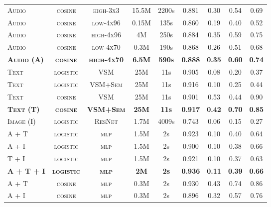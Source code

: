\documentclass{article}
\begin{document}
\begin{table*}[ht]
\begin{threeparttable}
\begin{tabular}{lcccccccc}
\textsc{Audio} & \textsc{cosine} & \textsc{high-3x3}           & 15.5M          & 2200s         & 0.881          & 0.30          & 0.54          & 0.69          \\
\textsc{Audio} & \textsc{cosine} & \textsc{low-4x96}           & 0.15M          & 135s          & 0.860          & 0.19          & 0.40          & 0.52          \\
\textsc{Audio} & \textsc{cosine} & \textsc{high-4x96}          & 4M             & 250s          & 0.884          & 0.35          & 0.59          & 0.75          \\
\textsc{Audio} & \textsc{cosine} & \textsc{low-4x70}           & 0.3M           & 190s          & 0.868          & 0.26          & 0.51          & 0.68          \\
\textbf{\textsc{Audio (A)}} & \textbf{\textsc{cosine}} & \textbf{\textsc{high-4x70}} & \textbf{6.5M}  & \textbf{590s} & \textbf{0.888} & \textbf{0.35} & \textbf{0.60} & \textbf{0.74} \\
\midrule
\textsc{Text} & \textsc{logistic} & \textsc{VSM} & 25M & 11s & 0.905 & 0.08 & 0.20 & 0.37 \\
\textsc{Text} & \textsc{logistic} & \textsc{VSM+Sem} & 25M & 11s & 0.916 & 0.10 & 0.25 & 0.44 \\
\textsc{Text} & \textsc{cosine} & \textsc{VSM} & 25M & 11s & 0.901 & 0.53 & 0.44 & 0.90 \\
\textbf{\textsc{Text (T)}} & \textbf{\textsc{cosine}} & \textbf{\textsc{VSM+Sem}} & \textbf{25M} & \textbf{11s} & \textbf{0.917} & \textbf{0.42} & \textbf{0.70} & \textbf{0.85} \\
\midrule
\textsc{Image (I)} & \textsc{logistic} & \textsc{ResNet} & 1.7M & 4009s & 0.743 & 0.06 & 0.15 & 0.27 \\
\midrule
\textsc{A + T} & \textsc{logistic} & \textsc{mlp} & 1.5M & 2s & 0.923 & 0.10 & 0.40 & 0.64 \\
\textsc{A + I} & \textsc{logistic} & \textsc{mlp} & 1.5M & 2s & 0.900 & 0.10 & 0.38 & 0.66 \\
\textsc{T + I} & \textsc{logistic} & \textsc{mlp} & 1.5M & 2s & 0.921 & 0.10 & 0.37 & 0.63 \\
\textbf{\textsc{A + T + I}} & \textbf{\textsc{logistic}} & \textbf{\textsc{mlp}} & \textbf{2M} & \textbf{2s} & \textbf{0.936} & \textbf{0.11} & \textbf{0.39} & \textbf{0.66} \\
\textsc{A + T} & \textsc{cosine} & \textsc{mlp} & 0.3M & 2s & 0.930 & 0.43 & 0.74 & 0.86 \\
\textsc{A + I} & \textsc{cosine} & \textsc{mlp} & 0.3M & 2s & 0.896 & 0.32 & 0.57 & 0.76 \\

\end{tabular}
\end{threeparttable}
\end{table*}
\end{document}
